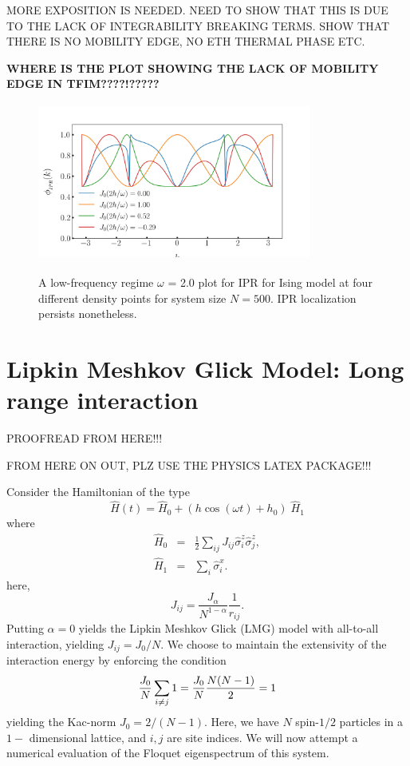 \documentclass[%
 reprint,
superscriptaddress,
 amsmath,amssymb,
 aps,
prb,
]{revtex4-2}
\begin{document}
MORE EXPOSITION IS NEEDED. NEED TO SHOW THAT THIS IS DUE TO THE LACK OF INTEGRABILITY BREAKING TERMS. SHOW THAT THERE IS NO MOBILITY EDGE, NO ETH THERMAL PHASE ETC.



\textbf{WHERE IS THE PLOT SHOWING THE LACK OF MOBILITY EDGE IN TFIM????!?????}


\begin{figure}[]
	\centering
	\includegraphics[height = 5.2cm, width =9cm]{low_frq_exactN500_ipr.jpeg}
	\label{fig:ipr_ising_lowfr}
	\caption{A low-frequency regime $\omega$ = 2.0 plot for IPR for Ising model at four different density points for system size $N = 500$. IPR localization persists nonetheless.}
\end{figure}

\section{\label{sec:level3}Lipkin Meshkov Glick Model: Long range interaction}

PROOFREAD FROM HERE!!!

FROM HERE ON OUT, PLZ USE THE PHYSICS LATEX PACKAGE!!!


Consider the Hamiltonian of the type
\begin{equation*}
	\hat{H}(t) = \hat{H}_0 + \left(h \cos{(\omega t)} + h_0\right)\; \hat{H}_1
\end{equation*}
where
\begin{eqnarray}
	\hat{H}_0 &=& \frac12 \sum_{ij}J_{ij}\hat{\sigma}^z_i\hat{\sigma}^z_j,\\
	\hat{H}_1 &=& \sum_i\hat{\sigma}^x_i.
\end{eqnarray}
here,
\begin{equation*}
	J_{ij} =\frac{J_\alpha}{N^{1-\alpha}}\frac{1}{r_{ij}}.
\end{equation*}
Putting  $\alpha = 0$ yields the Lipkin Meshkov Glick (LMG) model with all-to-all interaction, yielding $J_{ij} = J_0/N$. We choose to maintain the extensivity of the interaction energy by enforcing the condition
\begin{equation*}
	\frac{J_0}{N} \sum_{i\neq j}1=\frac{J_0}{N}\frac{N(N-1)}{2}=1\\
\end{equation*}
yielding the Kac-norm $J_0=2/(N-1)$. Here, we have $N$ spin-$1/2$ particles in a $1-$ dimensional lattice, and $i,j$ are site indices. We will now attempt a numerical evaluation of
the Floquet eigenspectrum of this system.
\end{document}
